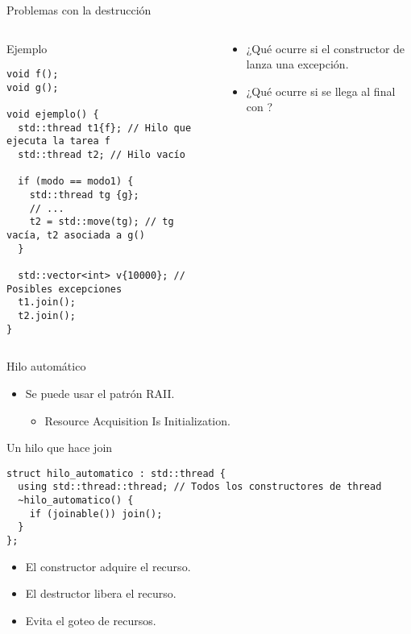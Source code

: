 \begin{frame}[fragile]{Problemas con la destrucción}
\begin{columns}

\begin{column}{.65\textwidth}
\begin{block}{Ejemplo}
\begin{lstlisting}
void f();
void g();

void ejemplo() {
  std::thread t1{f}; // Hilo que ejecuta la tarea f
  std::thread t2; // Hilo vacío

  if (modo == modo1) {
    std::thread tg {g}; 
    // ...
    t2 = std::move(tg); // tg vacía, t2 asociada a g()
  }

  std::vector<int> v{10000}; // Posibles excepciones
  t1.join();
  t2.join();
}
\end{lstlisting}
\end{block}
\end{column}

\begin{column}{.35\textwidth}
\begin{itemize}
  \item ¿Qué ocurre si el constructor de  lanza una excepción.
  \vspace{2em}
  \item ¿Qué ocurre si se llega al final con ?
\end{itemize}
\end{column}

\end{columns}
\end{frame}

\begin{frame}[fragile]{Hilo automático}
\begin{itemize}
  \item Se puede usar el patrón RAII.
    \begin{itemize}
      \item Resource Acquisition Is Initialization.
    \end{itemize}
\end{itemize}
\begin{block}{Un hilo que hace join}
\begin{lstlisting}
struct hilo_automatico : std::thread {
  using std::thread::thread; // Todos los constructores de thread
  ~hilo_automatico() { 
    if (joinable()) join(); 
  }
};
\end{lstlisting}
\end{block}
\begin{itemize}
  \item El constructor adquire el recurso.
  \item El destructor libera el recurso.
  \item Evita el goteo de recursos.
\end{itemize}
\end{frame}

